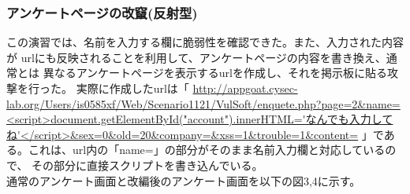 \documentclass[dvipdfmx,autodetect-engine,titlepage]{jsarticle}
\begin{document}
\subsubsection*{アンケートページの改竄(反射型)}
この演習では、名前を入力する欄に脆弱性を確認できた。また、入力された内容が
urlにも反映されることを利用して、アンケートページの内容を書き換え、通常とは
異なるアンケートページを表示するurlを作成し、それを掲示板に貼る攻撃を行った。
実際に作成したurlは「
\url{http://appgoat.cysec-lab.org/Users/is0585xf/Web/Scenario1121/VulSoft/enquete.php?page=2&name=<script>document.getElementById("account").innerHTML='なんでも入力してね'</script>&sex=0&old=20&company=&xss=1&trouble=1&content=}
」である。これは、url内の「name=」の部分がそのまま名前入力欄と対応しているので、
その部分に直接スクリプトを書き込んでいる。\\
通常のアンケート画面と改編後のアンケート画面を以下の図3,4に示す。
\end{document}

